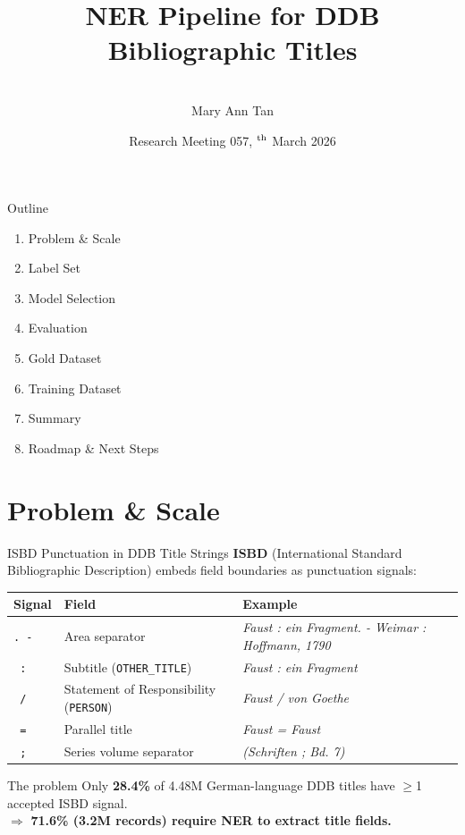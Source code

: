 \documentclass[xcolor,aspectratio=169,compress]{beamer}
\title[RM 057 --- GeMeA NER]{NER Pipeline for DDB Bibliographic Titles}
\author[M.A.\ Tan]{
  \\[.8cm]
  Mary Ann Tan}
\institute[FIZ-KDAI]{FIZ Karlsruhe -- Leibniz Institute for Information Infrastructure, KDAI}
\date[RM 057, 30.03.2026]{Research Meeting 057, {\sansmath 30$^{\rm th}$} March 2026}
\begin{document}
\frame[plain]{\titlepage}

\begin{frame}{Outline}
  \begin{enumerate}
    \item Problem \& Scale
    \item Label Set
    \item Model Selection
    \item Evaluation
    \item Gold Dataset
    \item Training Dataset
    \item Summary
    \item Roadmap \& Next Steps
  \end{enumerate}
\end{frame}

\section{Problem \& Scale}

\begin{frame}{ISBD Punctuation in DDB Title Strings}
  \small
  \textbf{ISBD} (International Standard Bibliographic Description) embeds field boundaries as punctuation signals:
  \smallskip
  \begin{center}
  \begin{tabular}{lll}
    \toprule
    Signal & Field & Example \\
    \midrule
    \texttt{. -} & Area separator & \textit{Faust : ein Fragment. - Weimar : Hoffmann, 1790} \\
    \texttt{ :}  & Subtitle (\texttt{OTHER\_TITLE}) & \textit{Faust : ein Fragment} \\
    \texttt{ /}  & Statement of Responsibility (\texttt{PERSON}) & \textit{Faust / von Goethe} \\
    \texttt{ =}  & Parallel title & \textit{Faust = Faust} \\
    \texttt{ ;}  & Series volume separator & \textit{(Schriften ; Bd. 7)} \\
    \bottomrule
  \end{tabular}
  \end{center}
  \smallskip
  \begin{block}{The problem}
    Only \textbf{28.4\%} of 4.48M German-language DDB titles have $\geq$1 accepted ISBD signal.\\
    $\Rightarrow$ \textbf{71.6\% (3.2M records) require NER to extract title fields.}
  \end{block}
\end{frame}
\end{document}
